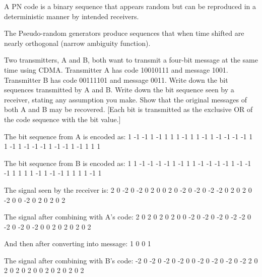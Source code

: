 \documentclass{supervision}
\begin{document}
\begin{questions}
\begin{parts}
\begin{subparts}
\begin{solution}
\begin{description}
                    A PN code is a binary sequence that appears random but can
                    be reproduced in a deterministic manner by intended
                    receivers.

                    The Pseudo-random generators produce sequences that
                    when time shifted are nearly orthogonal (narrow ambiguity
                    function).
                \end{description}
              \end{solution}

            \subpart Two transmitters, A and B, both want to transmit a
              four-bit message at the same time using CDMA. Transmitter A has
              code 10010111 and message 1001. Transmitter B has code 00111101
              and message 0011. Write down the bit sequences transmitted by A
              and B. Write down the bit sequence seen by a receiver, stating
              any assumption you make. Show that the original messages of
              both A and B may be recovered. [Each bit is transmitted as the
              exclusive OR of the code sequence with the bit value.]
              \begin{solution}
                \begin{code}{{}}
                The bit sequence from A is encoded as:
                 1 -1 -1  1 -1  1  1  1
                -1  1  1 -1  1 -1 -1 -1
                -1  1  1 -1  1 -1 -1 -1
                 1 -1 -1  1 -1  1  1  1

                The bit sequence from B is encoded as:
                 1  1 -1 -1 -1 -1  1 -1
                 1  1 -1 -1 -1 -1  1 -1
                -1 -1  1  1  1  1 -1  1
                -1 -1  1  1  1  1 -1  1

                The signal seen by the receiver is:
                 2  0 -2  0 -2  0  2  0
                 0  2  0 -2  0 -2  0 -2
                -2  0  2  0  2  0 -2  0
                 0 -2  0  2  0  2  0  2

                The signal after combining with A's code:
                 2  0  2  0  2  0  2  0
                 0 -2  0 -2  0 -2  0 -2
                -2  0 -2  0 -2  0 -2  0
                 0  2  0  2  0  2  0  2

                And then after converting into message:
                1 0 0 1

                The signal after combining with B's code:
                -2  0 -2  0 -2  0 -2  0
                 0 -2  0 -2  0 -2  0 -2
                 2  0  2  0  2  0  2  0
                 0  2  0  2  0  2  0  2


\end{code}
\end{solution}
\end{subparts}
\end{parts}
\end{questions}
\end{document}
